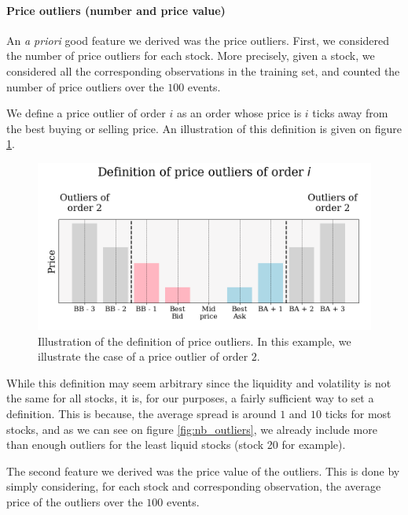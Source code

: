 \documentclass[switch, 11pt]{article}
\begin{document}
\begin{multicols}{2}

    \paragraph{Price outliers (number and price value)}
    An \textit{a priori} good feature we derived was the price outliers. First, we considered the number of price outliers for each stock. More precisely, given a stock, we considered all the corresponding observations in the training set, and counted the number of price outliers over the $100$ events.

    We define a price outlier of order $i$ as an order whose price is $i$ ticks away from the best buying or selling price. An illustration of this definition is given on figure \ref{fig:def_outliers}.
    \begin{figure}[H]
        \centering
        \includegraphics[width=\columnwidth]{figures/price_outliers_def.png}
        \caption{Illustration of the definition of price outliers. In this example, we illustrate the case of a price outlier of order $2$.}
        \label{fig:def_outliers}
    \end{figure}
    While this definition may seem arbitrary since the liquidity and volatility is not the same for all stocks, it is, for our purposes, a fairly sufficient way to set a definition. This is because, the average spread is around $1$ and $10$ ticks for most stocks, and as we can see on figure \ref{fig:nb_outliers}, we already include more than enough outliers for the least liquid stocks (stock 20 for example).

    The second feature we derived was the price value of the outliers. This is done by simply considering, for each stock and corresponding observation, the average price of the outliers over the $100$ events.


\end{multicols}
\end{document}
